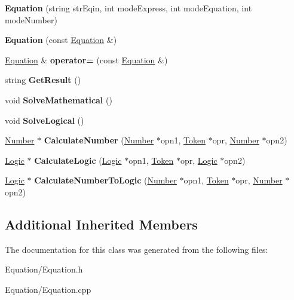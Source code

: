 \begin{DoxyCompactItemize}
\item 
\hypertarget{class_equation_aed2c4b2738e9cb3c0746faa098c834e3}{}{\bfseries Equation} (string str\+Eqin, int mode\+Express, int mode\+Equation, int mode\+Number)\label{class_equation_aed2c4b2738e9cb3c0746faa098c834e3}

\item 
\hypertarget{class_equation_a12c17c379993f3ca74d3c9554a977377}{}{\bfseries Equation} (const \hyperlink{class_equation}{Equation} \&)\label{class_equation_a12c17c379993f3ca74d3c9554a977377}

\item 
\hypertarget{class_equation_a868f0c41076b82a30a280100bd7d3402}{}\hyperlink{class_equation}{Equation} \& {\bfseries operator=} (const \hyperlink{class_equation}{Equation} \&)\label{class_equation_a868f0c41076b82a30a280100bd7d3402}

\item 
\hypertarget{class_equation_a2c778077ebd9c7a3f5b5e0889ac58784}{}string {\bfseries Get\+Result} ()\label{class_equation_a2c778077ebd9c7a3f5b5e0889ac58784}

\item 
\hypertarget{class_equation_afbca132bd94e8bcb73e33222a5853397}{}void {\bfseries Solve\+Mathematical} ()\label{class_equation_afbca132bd94e8bcb73e33222a5853397}

\item 
\hypertarget{class_equation_a908a02ec6e453f7cd812f7f9226c138f}{}void {\bfseries Solve\+Logical} ()\label{class_equation_a908a02ec6e453f7cd812f7f9226c138f}

\item 
\hypertarget{class_equation_a4db683603847c120852cfb6ab03388d8}{}\hyperlink{class_number}{Number} $\ast$ {\bfseries Calculate\+Number} (\hyperlink{class_number}{Number} $\ast$opn1, \hyperlink{class_token}{Token} $\ast$opr, \hyperlink{class_number}{Number} $\ast$opn2)\label{class_equation_a4db683603847c120852cfb6ab03388d8}

\item 
\hypertarget{class_equation_aec120c579438bd2a8aa6ab63b87a034e}{}\hyperlink{class_logic}{Logic} $\ast$ {\bfseries Calculate\+Logic} (\hyperlink{class_logic}{Logic} $\ast$opn1, \hyperlink{class_token}{Token} $\ast$opr, \hyperlink{class_logic}{Logic} $\ast$opn2)\label{class_equation_aec120c579438bd2a8aa6ab63b87a034e}

\item 
\hypertarget{class_equation_ad6d9f2b21a528864ab0ef3056895c27c}{}\hyperlink{class_logic}{Logic} $\ast$ {\bfseries Calculate\+Number\+To\+Logic} (\hyperlink{class_number}{Number} $\ast$opn1, \hyperlink{class_token}{Token} $\ast$opr, \hyperlink{class_number}{Number} $\ast$opn2)\label{class_equation_ad6d9f2b21a528864ab0ef3056895c27c}

\end{DoxyCompactItemize}
\subsection*{Additional Inherited Members}


The documentation for this class was generated from the following files\+:\begin{DoxyCompactItemize}
\item 
Equation/Equation.\+h\item 
Equation/Equation.\+cpp\end{DoxyCompactItemize}
